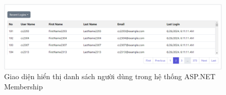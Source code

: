 \documentclass[14pt]{article}
\begin{document}
\begin{figure}
    \centering
    \includegraphics[width=0.8\linewidth]{images/list.png}
    \caption{Giao diện hiển thị danh sách người dùng trong hệ thống ASP.NET Membership}
    \label{fig:list}
\end{figure}
    
    
   
    \pagebreak 
    
    
    \nocite{*}

    
\end{document}
